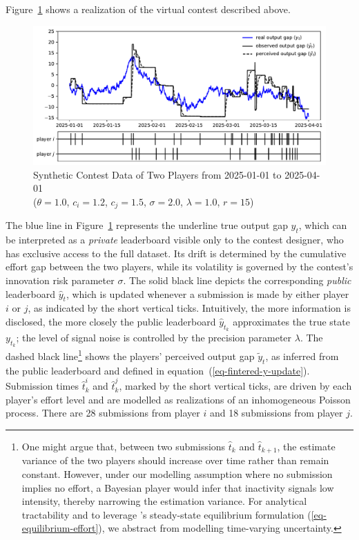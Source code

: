 \documentclass[mnsc]{informs3}
\begin{document}
Figure~\ref{fig-synthetic_90} shows a realization of the virtual contest described above.

\begin{figure}[!ht]
	\noindent\includegraphics[scale=0.75]{synthetic_data.pdf}
	\caption{Synthetic Contest Data of Two Players from 2025-01-01 to 2025-04-01\\($\theta = 1.0$, $c_i = 1.2$, $c_j = 1.5$, $\sigma = 2.0$, $\lambda = 1.0$, $r = 15$)}
	\label{fig-synthetic_90}
\end{figure}

The blue line in Figure~\ref{fig-synthetic_90} represents the underline true output gap $y_t$, which can be interpreted as a \textit{private} leaderboard visible only to the contest designer, who has exclusive access to the full dataset.
Its drift is determined by the cumulative effort gap between the two players, while its volatility is governed by the contest’s innovation risk parameter $\sigma$. 
The solid black line depicts the corresponding \textit{public} leaderboard $\hat{y}_t$, which is updated whenever a submission is made by either player $i$ or $j$, as indicated by the short vertical ticks.
Intuitively, the more information is disclosed, the more closely the public leaderboard $\hat{y}_{t_k}$ approximates the true state $y_{t_k}$; the level of signal noise is controlled by the precision parameter $\lambda$.
The dashed black line\footnote{
One might argue that, between two submissions $\hat{t}_{k}$ and $\hat{t}_{k+1}$, the estimate variance of the two players should increase over time rather than remain constant. 
However, under our modelling assumption where no submission implies no effort, a Bayesian player would infer that inactivity signals low intensity, thereby narrowing the estimation variance. 
For analytical tractability and to leverage \cite{ryvkin2022fight}'s steady-state equilibrium formulation (\ref{eq-equilibrium-effort}), we abstract from modelling time-varying uncertainty.} shows the players’ perceived output gap $\tilde{y}_t$, as inferred from the public leaderboard and defined in equation~(\ref{eq-fintered-y-update}).
Submission times $\hat{t}^i_k$ and $\hat{t}^j_k$, marked by the short vertical ticks, are driven by each player’s effort level and are modelled as realizations of an inhomogeneous Poisson process.
There are 28 submissions from player $i$ and 18 submissions from player $j$. 
\end{document}
